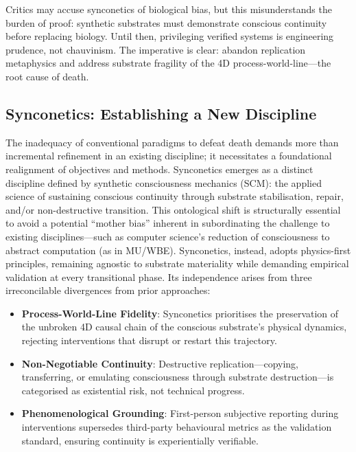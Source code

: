 \documentclass[10pt]{article}
\begin{document}
\begin{sloppypar}
  Critics may accuse synconetics of biological bias, but this misunderstands the burden of proof: synthetic substrates must demonstrate conscious continuity before replacing biology. Until then, privileging verified systems is engineering prudence, not chauvinism. The imperative is clear: abandon replication metaphysics and address substrate fragility of the 4D process-world-line—the root cause of death.

  \subsection{Synconetics: Establishing a New Discipline}
  \label{sec:new-discipline}

  The inadequacy of conventional paradigms to defeat death demands more than incremental refinement in an existing discipline; it necessitates a foundational realignment of objectives and methods. Synconetics emerges as a distinct discipline defined by synthetic consciousness mechanics (SCM): the applied science of sustaining conscious continuity through substrate stabilisation, repair, and/or non-destructive transition. This ontological shift is structurally essential to avoid a potential “mother bias” inherent in subordinating the challenge to existing disciplines—such as computer science’s reduction of consciousness to abstract computation (as in MU/WBE). Synconetics, instead, adopts physics-first principles, remaining agnostic to substrate materiality while demanding empirical validation at every transitional phase. Its independence arises from three irreconcilable divergences from prior approaches:

  \begin{itemize}
    \item \textbf{Process-World-Line Fidelity}: Synconetics prioritises the preservation of the unbroken 4D causal chain of the conscious substrate’s physical dynamics, rejecting interventions that disrupt or restart this trajectory.
    \item \textbf{Non-Negotiable Continuity}: Destructive replication—copying, transferring, or emulating consciousness through substrate destruction—is categorised as existential risk, not technical progress.
    \item \textbf{Phenomenological Grounding}: First-person subjective reporting during interventions supersedes third-party behavioural metrics as the validation standard, ensuring continuity is experientially verifiable.
  \end{itemize}


\end{sloppypar}
\end{document}
